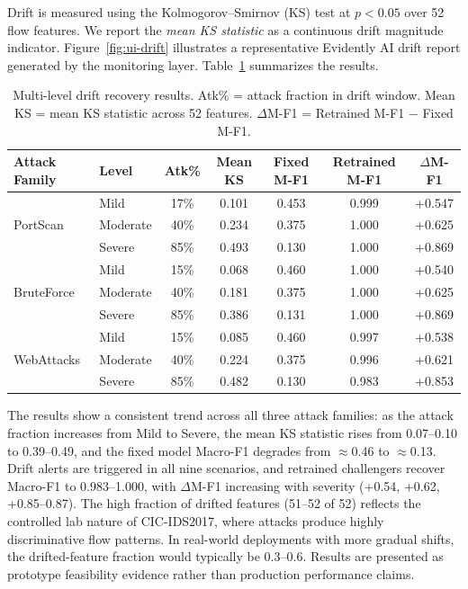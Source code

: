 \documentclass[runningheads]{llncs}
\begin{document}
Drift is measured using the Kolmogorov--Smirnov (KS) test at $p < 0.05$ over 52 flow features. We report the \emph{mean KS statistic} as a continuous drift magnitude indicator. Figure~\ref{fig:ui-drift} illustrates a representative Evidently AI drift report generated by the monitoring layer. Table~\ref{tab:drift-multilevel} summarizes the results.


\begin{table}[htbp]
\centering
\caption{Multi-level drift recovery results. Atk\% = attack fraction in drift window. Mean KS = mean KS statistic across 52 features. $\Delta$M-F1 = Retrained M-F1 $-$ Fixed M-F1.}
\label{tab:drift-multilevel}
\small
\setlength{\tabcolsep}{4pt}
\begin{tabular}{@{}llccccc@{}}
\toprule
Attack Family & Level & Atk\% & Mean KS & Fixed M-F1 & Retrained M-F1 & $\Delta$M-F1 \\
\midrule
\multirow{3}{*}{PortScan}
  & Mild     & 17\% & 0.101 & 0.453 & 0.999 & +0.547 \\
  & Moderate & 40\% & 0.234 & 0.375 & 1.000 & +0.625 \\
  & Severe   & 85\% & 0.493 & 0.130 & 1.000 & +0.869 \\
\midrule
\multirow{3}{*}{BruteForce}
  & Mild     & 15\% & 0.068 & 0.460 & 1.000 & +0.540 \\
  & Moderate & 40\% & 0.181 & 0.375 & 1.000 & +0.625 \\
  & Severe   & 85\% & 0.386 & 0.131 & 1.000 & +0.869 \\
\midrule
\multirow{3}{*}{WebAttacks}
  & Mild     & 15\% & 0.085 & 0.460 & 0.997 & +0.538 \\
  & Moderate & 40\% & 0.224 & 0.375 & 0.996 & +0.621 \\
  & Severe   & 85\% & 0.482 & 0.130 & 0.983 & +0.853 \\
\bottomrule
\end{tabular}
\end{table}

The results show a consistent trend across all three attack families: as the attack fraction increases from Mild to Severe, the mean KS statistic rises from 0.07--0.10 to 0.39--0.49, and the fixed model Macro-F1 degrades from $\approx$0.46 to $\approx$0.13. Drift alerts are triggered in all nine scenarios, and retrained challengers recover Macro-F1 to 0.983--1.000, with $\Delta$M-F1 increasing with severity (+0.54, +0.62, +0.85--0.87). The high fraction of drifted features (51--52 of 52) reflects the controlled lab nature of CIC-IDS2017, where attacks produce highly discriminative flow patterns. In real-world deployments with more gradual shifts, the drifted-feature fraction would typically be 0.3--0.6. Results are presented as prototype feasibility evidence rather than production performance claims.
\end{document}
